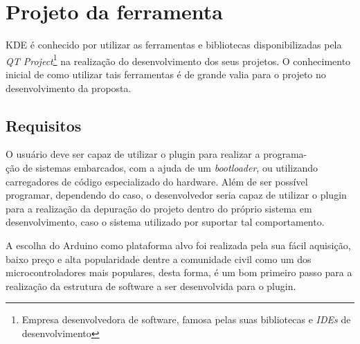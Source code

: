 \chapter{Projeto da ferramenta}

KDE é conhecido por utilizar as ferramentas e bibliotecas disponibilizadas pela \textit{QT Project}\footnote{Empresa desenvolvedora  de software, famosa pelas suas bibliotecas e \textit{IDEs} de desenvolvimento} na realização do desenvolvimento dos seus projetos. O conhecimento inicial de como utilizar tais ferramentas é de grande valia para o projeto no desenvolvimento da proposta.


\section{Requisitos}

O usuário deve ser capaz de utilizar o plugin para realizar a programa-\\ção de sistemas embarcados, com a ajuda de um \textit{bootloader}, ou utilizando carregadores de código especializado do hardware. Além de ser possível programar, dependendo do caso, o desenvolvedor seria capaz de utilizar o plugin para a realização da depuração do projeto dentro do próprio sistema em desenvolvimento, caso o sistema utilizado por suportar tal comportamento.

A escolha do Arduino como plataforma alvo foi realizada pela sua fácil aquisição, baixo preço e alta popularidade dentre a comunidade civil como um dos microcontroladores mais populares, desta forma, é um bom primeiro passo para a realização da estrutura de software a ser desenvolvida para o plugin.

